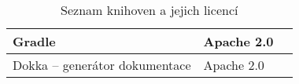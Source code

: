 \begin{table}[hbt!]
\begin{tabular}{|l|l|l|}
        Gradle                                            & Apache 2.0\tablefootnote{\url{https://github.com/gradle/gradle/blob/master/LICENSE}}                                      \\ \hline
        Dokka -- generátor dokumentace                    & Apache 2.0\tablefootnote{\url{https://github.com/Kotlin/dokka/blob/master/LICENSE}}                                       \\ \hline
    \end{tabular}
    \caption{Seznam knihoven a jejich licencí}
    \label{tab:libraries-licenses}
\end{table}

